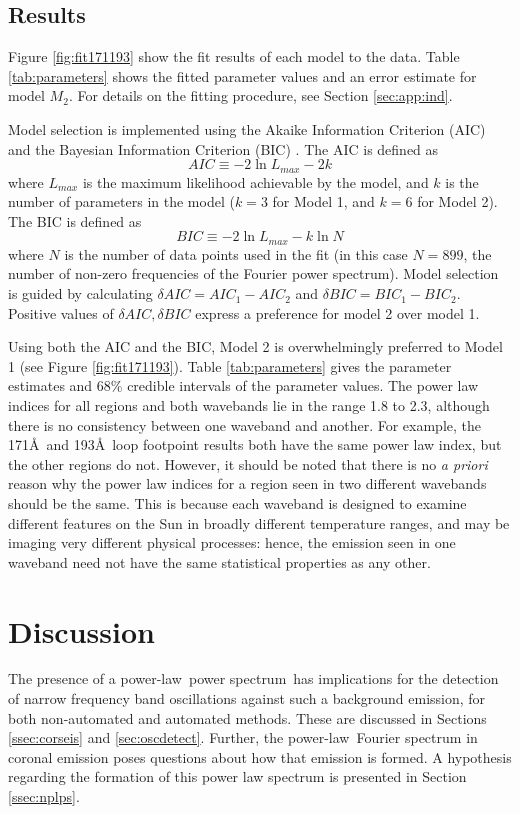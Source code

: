 \documentclass{aastex}
\newcommand{\PS}{power spectrum}
\newcommand{\PL}{power-law}
\begin{document}
\subsection{Results}\label{ssec:results}
Figure \ref{fig:fit171193} show the fit results of each model to the
data.  Table \ref{tab:parameters} shows the fitted parameter values
and an error estimate for model $M_{2}$.  For details on the fitting
procedure, see Section \ref{sec:app:ind}.

Model selection is implemented using the Akaike Information Criterion
(AIC) and the Bayesian Information Criterion (BIC)
\citep{2007MNRAS.377L..74L, WICS:WICS199}.  The AIC is defined as
\begin{equation}\label{eqn:aic}
AIC \equiv -2 \ln L_{max} - 2k
\end{equation}
where $L_{max}$ is the maximum likelihood achievable by the model, and
$k$ is the number of parameters in the model ($k=3$ for Model 1, and
$k=6$ for Model 2).  The BIC is defined as
\begin{equation}\label{eqn:bic}
BIC \equiv -2 \ln L_{max} - k\ln N
\end{equation}
where $N$ is the number of data points used in the fit (in this case
$N=899$, the number of non-zero frequencies of the Fourier power
spectrum).  Model selection is guided by calculating $\delta AIC =
AIC_{1} - AIC_{2}$ and $\delta BIC = BIC_{1} - BIC_{2}$.  Positive
values of $\delta AIC, \delta BIC$ express a preference for model 2
over model 1.

Using both the AIC and the BIC, Model 2 is overwhelmingly preferred to
Model 1 (see Figure \ref{fig:fit171193}). Table \ref{tab:parameters}
gives the parameter estimates and 68\% credible intervals of the
parameter values.  The power law indices for all regions and both
wavebands lie in the range 1.8 to 2.3, although there is no
consistency between one waveband and another.  For example, the
171\AA\ and 193\AA\ loop footpoint results both have the same power
law index, but the other regions do not.  However, it should be noted
that there is no {\it a priori} reason why the power law indices for a
region seen in two different wavebands should be the same.  This is
because each waveband is designed to examine different features on the
Sun in broadly different temperature ranges, and may be imaging very
different physical processes: hence, the emission seen in one waveband
need not have the same statistical properties as any other.

\section{Discussion}
The presence of a \PL\ \PS\ has implications for the detection of
narrow frequency band oscillations against such a background emission,
for both non-automated and automated methods.  These are discussed in
Sections \ref{ssec:corseis} and \ref{sec:oscdetect}.  Further, the
\PL\ Fourier spectrum in coronal emission poses questions about how
that emission is formed.  A hypothesis regarding the formation of this
power law spectrum is presented in Section \ref{ssec:nplps}.
\end{document}
